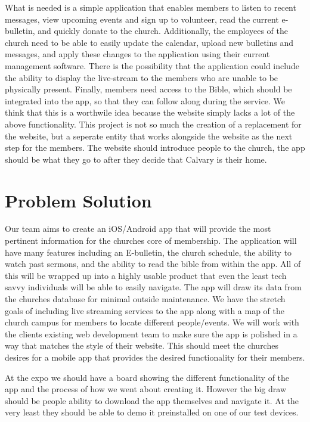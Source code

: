 \documentclass[letterpaper,10pt,draftclsnofoot,onecolumn,titlepage]{IEEEtran}
\begin{document}
	What is needed is a simple application that enables members to listen to recent messages, view upcoming events and sign up to volunteer, read the current e-bulletin, and quickly donate to the church. 
	Additionally, the employees of the church need to be able to easily update the calendar, upload new bulletins and messages, and apply these changes to the application using their current management software. 
	There is the possibility that the application could include the ability to display the live-stream to the members who are unable to be physically present. 
	Finally, members need access to the Bible, which should be integrated into the app, so that they can follow along during the service. 
	We think that this is a worthwile idea because the website simply lacks a lot of the above functionality.
	This project is not so much the creation of a replacement for the website, but a seperate entity that works alongside the website as the next step for the members.
	The website should introduce people to the church, the app should be what they go to after they decide that Calvary is their home.
	
	\section*{Problem Solution}
	Our team aims to create an iOS/Android app that will provide the most pertinent information for the churches core of membership. 
	The application will have many features including an E-bulletin, the church schedule, the ability to watch past sermons, and the ability to read the bible from within the app. 
	All of this will be wrapped up into a highly usable product that even the least tech savvy individuals will be able to easily navigate. 
	The app will draw its data from the churches database for minimal outside maintenance. 
	We have the stretch goals of including live streaming services to the app along with a map of the church campus for members to locate different people/events.  
	We will work with the clients existing web development team to make sure the app is polished in a way that matches the style of their website. 
	This should meet the churches desires for a mobile app that provides the desired functionality for their members.

	At the expo we should have a board showing the different functionality of the app and the process of how we went about creating it. 
	However the big draw should be people ability to download the app themselves and navigate it. 
	At the very least they should be able to demo it preinstalled on one of our test devices.
	
\end{document}

